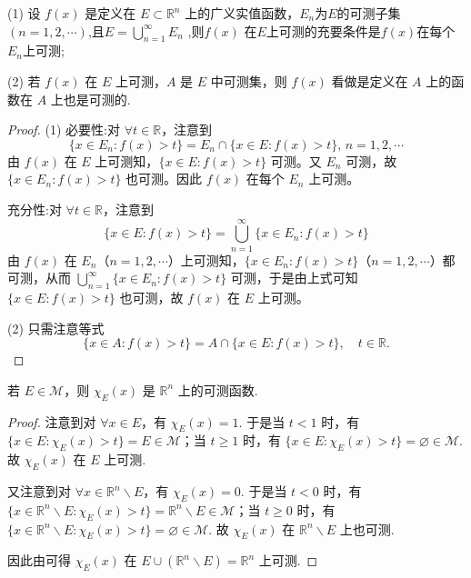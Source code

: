 \documentclass[../../main.tex]{subfiles}%
\begin{document}
\begin{theorem}\label{theorem:定理3.3}
(1) 设 \(f(x)\) 是定义在 \(E\subset \mathbb{R}^n\) 上的广义实值函数，$E_n$为$E$的可测子集$(n=1,2,\cdots)$,且$E=\bigcup_{n=1}^{\infty}E_n$ ,则\(f(x)\) 在$E$上可测的充要条件是\(f(x)\)在每个$E_n$上可测;

(2) 若 \(f(x)\) 在 \(E\) 上可测，\(A\) 是 \(E\) 中可测集，则 \(f(x)\) 看做是定义在 \(A\) 上的函数在 \(A\) 上也是可测的.
\end{theorem}
\begin{proof}
(1) {\heiti 必要性:}对 \( \forall t \in \mathbb{R} \)，注意到
\[
\{ x \in E_n : f(x) > t \} = E_n \cap \{ x \in E : f(x) > t \}, \, n = 1, 2, \cdots
\]
由 \( f(x) \) 在 \( E \) 上可测知，\( \{ x \in E : f(x) > t \} \) 可测。又 \( E_n \) 可测，故 \( \{ x \in E_n : f(x) > t \} \) 也可测。因此 \( f(x) \) 在每个 \( E_n \) 上可测。

{\heiti 充分性:}对 \( \forall t \in \mathbb{R} \)，注意到
\[
\{ x \in E : f(x) > t \} = \bigcup_{n = 1}^{\infty} \{ x \in E_n : f(x) > t \}
\]
由 \( f(x) \) 在 \( E_n \)（\( n = 1, 2, \cdots \)）上可测知，\( \{ x \in E_n : f(x) > t \} \)（\( n = 1, 2, \cdots \)）都可测，从而 \( \bigcup_{n = 1}^{\infty} \{ x \in E_n : f(x) > t \} \) 可测，于是由上式可知 \( \{ x \in E : f(x) > t \} \) 也可测，故 \( f(x) \) 在 \( E \) 上可测。

(2) 只需注意等式
\[
\{x \in A: f(x) > t\} = A \cap \{x \in E: f(x) > t\}, \quad t \in \mathbb{R}.
\]
\end{proof}

\begin{proposition}
若 \(E \in \mathscr{M}\)，则 \(\chi_E(x)\) 是 \(\mathbb{R}^n\) 上的可测函数. 
\end{proposition}
\begin{proof}
注意到对 \(\forall x \in E\)，有 \(\chi_E(x) = 1\). 于是当 \(t < 1\) 时，有 \(\{x \in E: \chi_E(x) > t\} = E \in \mathscr{M}\)；当 \(t \geqslant 1\) 时，有 \(\{x \in E: \chi_E(x) > t\} = \varnothing \in \mathscr{M}\). 故 \(\chi_E(x)\) 在 \(E\) 上可测.

又注意到对 \(\forall x \in \mathbb{R}^n \backslash E\)，有 \(\chi_E(x) = 0\). 于是当 \(t < 0\) 时，有 \(\{x \in \mathbb{R}^n \backslash E: \chi_E(x) > t\} = \mathbb{R}^n \backslash E \in \mathscr{M}\)；当 \(t \geqslant 0\) 时，有 \(\{x \in \mathbb{R}^n \backslash E: \chi_E(x) > t\} = \varnothing \in \mathscr{M}\). 故 \(\chi_E(x)\) 在 \(\mathbb{R}^n \backslash E\) 上也可测.

因此由可得 \(\chi_E(x)\) 在 \(E \cup (\mathbb{R}^n \backslash E) = \mathbb{R}^n\) 上可测.
\end{proof}
\end{document}
